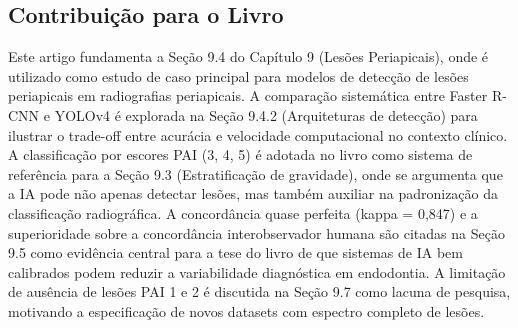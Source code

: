\subsection{Contribuição para o Livro}
Este artigo fundamenta a Seção 9.4 do Capítulo 9 (Lesões Periapicais),
onde é utilizado como estudo de caso principal para modelos de
detecção de lesões periapicais em radiografias periapicais. A
comparação sistemática entre Faster R-CNN e YOLOv4 é explorada na
Seção 9.4.2 (Arquiteturas de detecção) para ilustrar o trade-off
entre acurácia e velocidade computacional no contexto clínico. A
classificação por escores PAI (3, 4, 5) é adotada no livro como
sistema de referência para a Seção 9.3 (Estratificação de gravidade),
onde se argumenta que a IA pode não apenas detectar lesões, mas
também auxiliar na padronização da classificação radiográfica. A
concordância quase perfeita (kappa = 0,847) e a superioridade sobre
a concordância interobservador humana são citadas na Seção 9.5 como
evidência central para a tese do livro de que sistemas de IA bem
calibrados podem reduzir a variabilidade diagnóstica em endodontia.
A limitação de ausência de lesões PAI 1 e 2 é discutida na Seção 9.7
como lacuna de pesquisa, motivando a especificação de novos datasets
com espectro completo de lesões.

